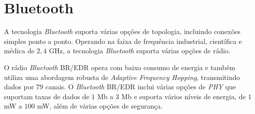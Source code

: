 \section{Bluetooth}
A  tecnologia \emph{Bluetooth}  suporta várias opções de topologia, incluindo conexões simples ponto a ponto. Operando na faixa de frequência industrial, científica e médica de $2,4$ GHz, a tecnologia \emph{Bluetooth} suporta várias opções de rádio.

O rádio \emph{Bluetooth} BR/EDR opera com baixo consumo de energia e também utiliza uma abordagem robusta de \textit{Adaptive Frequency Hopping}, transmitindo dados por $79$ canais. O \textit{Bluetooth} BR/EDR inclui várias opções de \textit{PHY} que suportam taxas de dados de $1$ Mb a $3$ Mb e suporta vários níveis de energia, de $1$mW a $100$ mW, além de várias opções de segurança.

